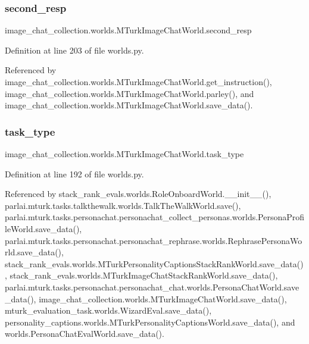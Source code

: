 \subsubsection{\texorpdfstring{second\+\_\+resp}{second\_resp}}
{\footnotesize\ttfamily image\+\_\+chat\+\_\+collection.\+worlds.\+M\+Turk\+Image\+Chat\+World.\+second\+\_\+resp}



Definition at line 203 of file worlds.\+py.



Referenced by image\+\_\+chat\+\_\+collection.\+worlds.\+M\+Turk\+Image\+Chat\+World.\+get\+\_\+instruction(), image\+\_\+chat\+\_\+collection.\+worlds.\+M\+Turk\+Image\+Chat\+World.\+parley(), and image\+\_\+chat\+\_\+collection.\+worlds.\+M\+Turk\+Image\+Chat\+World.\+save\+\_\+data().

\mbox{\label{classimage__chat__collection_1_1worlds_1_1MTurkImageChatWorld_a61f2dbe636a6b7286febaedbcd9f5b18}} 
\subsubsection{\texorpdfstring{task\+\_\+type}{task\_type}}
{\footnotesize\ttfamily image\+\_\+chat\+\_\+collection.\+worlds.\+M\+Turk\+Image\+Chat\+World.\+task\+\_\+type}



Definition at line 192 of file worlds.\+py.



Referenced by stack\+\_\+rank\+\_\+evals.\+worlds.\+Role\+Onboard\+World.\+\_\+\+\_\+init\+\_\+\+\_\+(), parlai.\+mturk.\+tasks.\+talkthewalk.\+worlds.\+Talk\+The\+Walk\+World.\+save(), parlai.\+mturk.\+tasks.\+personachat.\+personachat\+\_\+collect\+\_\+personas.\+worlds.\+Persona\+Profile\+World.\+save\+\_\+data(), parlai.\+mturk.\+tasks.\+personachat.\+personachat\+\_\+rephrase.\+worlds.\+Rephrase\+Persona\+World.\+save\+\_\+data(), stack\+\_\+rank\+\_\+evals.\+worlds.\+M\+Turk\+Personality\+Captions\+Stack\+Rank\+World.\+save\+\_\+data(), stack\+\_\+rank\+\_\+evals.\+worlds.\+M\+Turk\+Image\+Chat\+Stack\+Rank\+World.\+save\+\_\+data(), parlai.\+mturk.\+tasks.\+personachat.\+personachat\+\_\+chat.\+worlds.\+Persona\+Chat\+World.\+save\+\_\+data(), image\+\_\+chat\+\_\+collection.\+worlds.\+M\+Turk\+Image\+Chat\+World.\+save\+\_\+data(), mturk\+\_\+evaluation\+\_\+task.\+worlds.\+Wizard\+Eval.\+save\+\_\+data(), personality\+\_\+captions.\+worlds.\+M\+Turk\+Personality\+Captions\+World.\+save\+\_\+data(), and worlds.\+Persona\+Chat\+Eval\+World.\+save\+\_\+data().

